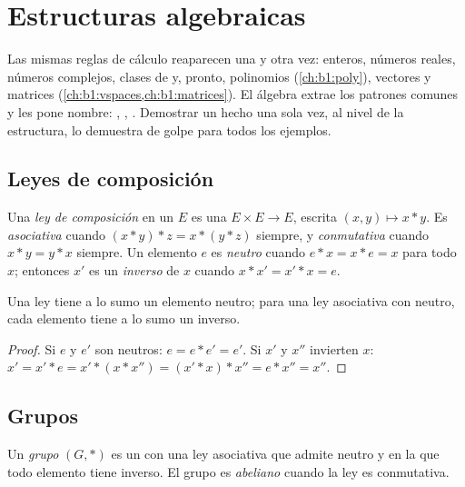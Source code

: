 \chapter{Estructuras algebraicas}\label{ch:b1:structures}

Las mismas reglas de cálculo reaparecen una y otra vez: enteros,
números reales, números complejos, clases de  y, pronto,
polinomios (\cref{ch:b1:poly}), vectores y matrices
(\cref{ch:b1:vspaces,ch:b1:matrices}). El álgebra extrae los patrones
comunes y les pone nombre: \emph{}, \emph{}, \emph{}.
Demostrar un hecho una sola vez, al nivel de la estructura, lo demuestra
de golpe para todos los ejemplos.

\section{Leyes de composición}

\begin{definition}\label{def:b1:structures:law}
Una \emph{ley de composición} en un 
$E$ es una  $E \times E \to E$, escrita
$(x, y) \mapsto x * y$. Es \emph{asociativa} cuando $(x*y)*z = x*(y*z)$
siempre, y \emph{conmutativa} cuando $x * y = y * x$ siempre. Un
elemento $e$ es \emph{neutro} cuando $e * x = x * e = x$ para todo $x$;
entonces $x'$ es un \emph{inverso} de $x$ cuando $x * x' = x' * x = e$.
\end{definition}

\begin{proposition}[Unicidad]\label{prop:b1:structures:unique}
Una ley tiene a lo sumo un elemento neutro; para una ley asociativa con
neutro, cada elemento tiene a lo sumo un inverso.
\end{proposition}

\begin{proof}
Si $e$ y $e'$ son neutros: $e = e * e' = e'$. Si $x'$ y $x''$ invierten
$x$: $x' = x' * e = x' * (x * x'') = (x' * x) * x'' = e * x''
= x''$.
\end{proof}

\section{Grupos}

\begin{definition}[Grupo]\label{def:b1:structures:group}
Un \emph{grupo} $(G, *)$ es un  con una ley
asociativa que admite neutro y en la que todo elemento tiene inverso. El
grupo es \emph{abeliano} cuando la ley es
conmutativa.
\end{definition}

